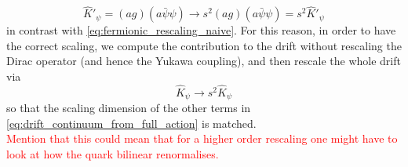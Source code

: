 \begin{equation}
    \widehat{K}'_\psi = (ag) (a\bar\psi \psi) \to s^2 (ag) (a\bar\psi \psi) = s^2 \widehat{K}'_\psi
    \label{eq:rescaling_blinear}
\end{equation}
in contrast with \eqref{eq:fermionic_rescaling_naive}. For this reason, in order to have the correct scaling, we compute the contribution to the drift without rescaling the Dirac operator (and hence the Yukawa coupling), and then rescale the whole drift via 
\begin{equation*}
    \widehat{K}_\psi \to s^2 \widehat{K}_\psi
\end{equation*}
so that the scaling dimension of the other terms in \eqref{eq:drift_continuum_from_full_action} is matched. \\
\textcolor{red}{Mention that this could mean that for a higher order rescaling one might have to look at how the quark bilinear renormalises.}

\newpage 